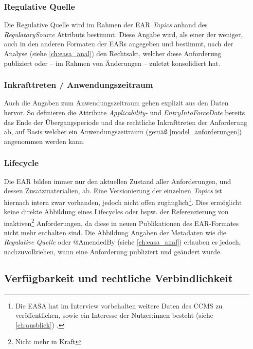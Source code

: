 \subsubsection{Regulative Quelle}

Die Regulative Quelle wird im Rahmen der \ac{EAR} \textit{Topics} anhand des \textit{RegulatorySource} Attributs bestimmt. 
Diese Angabe wird, als einer der weniger, auch in den anderen Formaten der \acp{EAR} angegeben und bestimmt, nach der Analyse (siehe \ref{ch:easa_anal}) den Rechtsakt, welcher diese Anforderung publiziert oder -- im Rahmen von Änderungen -- zuletzt konsolidiert hat. 

\pagebreak
\subsubsection{Inkrafttreten / Anwendungszeitraum}

Auch die Angaben zum Anwendungszeitraum gehen explizit aus den Daten hervor. 
So definieren die Attribute \textit{Applicability-} und \textit{EntryIntoForceDate} bereits das Ende der Übergangsperiode und das rechtliche Inkrafttreten der Anforderung ab, auf Basis welcher ein Anwendungszeitraum (gemäß \ref{model_anforderungen}) angenommen werden kann.

\subsubsection{Lifecycle}

Die \ac{EAR} bilden immer nur den aktuellen Zustand aller Anforderungen, und dessen Zusatzmaterialien, ab.
Eine Versionierung der einzelnen \textit{Topics} ist hiernach intern zwar vorhanden, jedoch nicht offen zugänglich\footnote{Die \ac{EASA} hat im Interview vorbehalten weitere Daten des \ac{CCMS} zu veröffentlichen, sowie ein Interesse der Nutzer:innen besteht (siehe \ref{ch:ausblick}) \cite{easa_xml_export}.}.
Dies ermöglicht keine direkte Abbildung eines Lifecycles oder bspw. der Referenzierung von inaktiven\footnote{Nicht mehr in Kraft} Anforderungen, da diese in neuen Publikationen des \ac{EAR}-Formates nicht mehr enthalten sind.
Die Abbildung 
Angaben der Metadaten wie die \textit{Regulative Quelle} oder @AmendedBy (siehe \ref{ch:easa_anal}) erlauben es jedoch, nachzuvollziehen, wann eine Anforderung publiziert und geändert wurde.

\subsection{Verfügbarkeit und rechtliche Verbindlichkeit}


